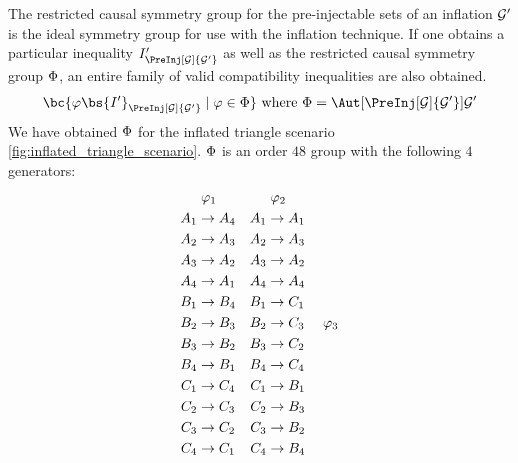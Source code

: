\documentclass[aps, 10pt, english, twoside, pra, nofootinbib, longbibliography]{revtex4-1}
\begin{document}
    The restricted causal symmetry group for the pre-injectable sets of an inflation $\mathcal{G}'$ is the ideal symmetry group for use with the inflation technique. If one obtains a particular inequality $I'_{\PreInj[\graph]{\graph'}}$ as well as the restricted causal symmetry group $\Phi$, an entire family of valid compatibility inequalities are also obtained.
    \[ \bc{\gep\bs{I'}_{\PreInj[\graph]{\graph'}} \mid \gep \in \gp} \text{ where } \gp = \Aut[\PreInj[\graph]{\graph'}]{\graph'} \]
    We have obtained $\Phi$ for the inflated triangle scenario \cref{fig:inflated_triangle_scenario}. $\Phi$ is an order $48$ group with the following $4$ generators:
    \begin{equation*}
    \begin{aligned}[c]
    &\hspace{1mm}\gep_1 \\
    A_1 &\to A_4 \\A_2 &\to A_3 \\A_3 &\to A_2 \\A_4 &\to A_1 \\B_1 &\to B_4 \\B_2 &\to B_3 \\B_3 &\to B_2 \\B_4 &\to B_1 \\C_1 &\to C_4 \\C_2 &\to C_3 \\C_3 &\to C_2 \\C_4 &\to C_1
    \end{aligned}
    \quad
    \begin{aligned}[c]
    &\hspace{1mm}\gep_2 \\
    A_1 &\to A_1 \\A_2 &\to A_3 \\A_3 &\to A_2 \\A_4 &\to A_4 \\B_1 &\to C_1 \\B_2 &\to C_3 \\B_3 &\to C_2 \\B_4 &\to C_4 \\C_1 &\to B_1 \\C_2 &\to B_3 \\C_3 &\to B_2 \\C_4 &\to B_4
    \end{aligned}
    \quad
    \begin{aligned}[c]
    &\hspace{1mm}\gep_3 \\

\end{aligned}
\end{equation*}
\end{document}

